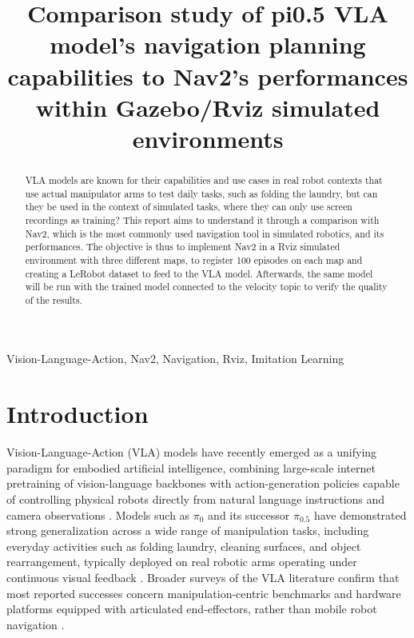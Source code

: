\documentclass[conference]{IEEEtran}
\begin{document}
\title{Comparison study of pi0.5 VLA model's navigation planning\\
capabilities to Nav2's performances within Gazebo/Rviz simulated environments}

\author{
}

\maketitle

\begin{abstract}
VLA models are known for their capabilities and use cases in real robot contexts that use actual manipulator arms to test daily tasks, such as folding the laundry, but can they be used in the context of simulated tasks, where they can only use screen recordings as training? This report aims to understand it through a comparison with Nav2, which is the most commonly used navigation tool in simulated robotics, and its performances. The objective is thus to implement Nav2 in a Rviz simulated environment with three different maps, to register 100 episodes on each map and creating a LeRobot dataset to feed to the VLA model. Afterwards, the same model will be run with the trained model connected to the velocity topic to verify the quality of the results.
\end{abstract}

\begin{IEEEkeywords}
Vision-Language-Action, Nav2, Navigation, Rviz, Imitation Learning
\end{IEEEkeywords}

\section{Introduction}

Vision-Language-Action (VLA) models have recently emerged as a unifying paradigm for embodied artificial intelligence, combining large-scale internet pretraining of vision-language backbones with action-generation policies capable of controlling physical robots directly from natural language instructions and camera observations \cite{black2024pi0, black2025pi05, brohan2023rt2}. Models such as $\pi_0$ and its successor $\pi_{0.5}$ have demonstrated strong generalization across a wide range of manipulation tasks, including everyday activities such as folding laundry, cleaning surfaces, and object rearrangement, typically deployed on real robotic arms operating under continuous visual feedback \cite{black2025pi05}. Broader surveys of the VLA literature confirm that most reported successes concern manipulation-centric benchmarks and hardware platforms equipped with articulated end-effectors, rather than mobile robot navigation \cite{ma2025surveyembodied, sapkota2025vlaapplications}.
\end{document}
